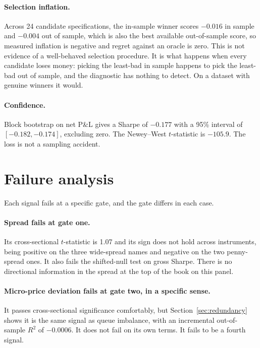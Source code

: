 \documentclass[11pt]{scrartcl}
\begin{document}
\paragraph{Selection inflation.} Across 24 candidate specifications, the in-sample winner scores $-0.016$ in sample and $-0.004$ out of sample, which is also the best available out-of-sample score, so measured inflation is negative and regret against an oracle is zero. This is not evidence of a well-behaved selection procedure. It is what happens when every candidate loses money: picking the least-bad in sample happens to pick the least-bad out of sample, and the diagnostic has nothing to detect. On a dataset with genuine winners it would.

\paragraph{Confidence.} Block bootstrap on net P\&L gives a Sharpe of $-0.177$ with a 95\% interval of $[-0.182, -0.174]$, excluding zero. The Newey--West $t$-statistic \cite{NeweyWest1987} is $-105.9$. The loss is not a sampling accident.

\section{Failure analysis}
\label{sec:failure}

Each signal fails at a specific gate, and the gate differs in each case.

\paragraph{Spread fails at gate one.} Its cross-sectional $t$-statistic is 1.07 and its sign does not hold across instruments, being positive on the three wide-spread names and negative on the two penny-spread ones. It also fails the shifted-null test on gross Sharpe. There is no directional information in the spread at the top of the book on this panel.

\paragraph{Micro-price deviation fails at gate two, in a specific sense.} It passes cross-sectional significance comfortably, but Section~\ref{sec:redundancy} shows it is the same signal as queue imbalance, with an incremental out-of-sample $R^2$ of $-0.0006$. It does not fail on its own terms. It fails to be a fourth signal.
\end{document}
